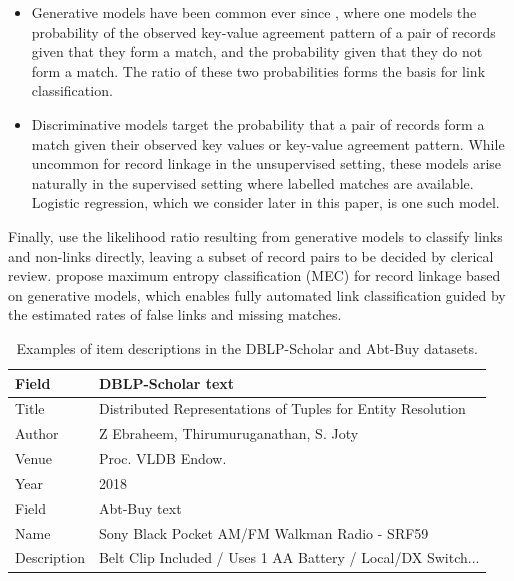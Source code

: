 \begin{itemize}[leftmargin=6mm,itemsep=0pt]

\item Generative models have been common ever since \citet{fellegi1969theory}, where one models the probability of the observed key-value agreement pattern of a pair of records given that they form a match, and the probability given that they do not form a match. The ratio of these two probabilities forms the basis for link classification.

\item Discriminative models target the probability that a pair of records form a match given their observed key values or key-value agreement pattern. While uncommon for record linkage in the unsupervised setting, these models arise naturally in the supervised setting where labelled matches are available. Logistic regression, which we consider later in this paper, is one such model.

\end{itemize}

Finally, \citet{fellegi1969theory} use the likelihood ratio resulting from generative models to classify links and non-links directly, leaving a subset of record pairs to be decided by clerical review. \citet{lee2021maximum} propose maximum entropy classification (MEC) for record linkage based on generative models, which enables fully automated link classification guided by the estimated rates of false links and missing matches.

\begin{table}[ht]
\centering
\caption{Examples of item descriptions in the DBLP-Scholar and Abt-Buy datasets.}
\begin{tabular}{l | l}
\toprule
Field & DBLP-Scholar text \\
\midrule
Title & Distributed Representations of Tuples for Entity Resolution \\
Author & Z Ebraheem, Thirumuruganathan, S. Joty \\
Venue & Proc. VLDB Endow. \\
Year & 2018 \\
\midrule
Field & Abt-Buy text \\
\midrule
Name & Sony Black Pocket AM/FM Walkman Radio - SRF59 \\
Description & Belt Clip Included / Uses 1 AA Battery / Local/DX Switch... \\
\bottomrule
\end{tabular}
\label{tab:text}
\end{table}

